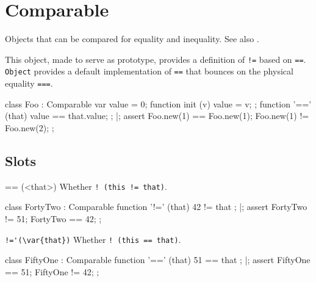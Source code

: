 
\section{Comparable}
Objects that can be compared for equality and inequality.  See also
.

This object, made to serve as prototype, provides a definition of
\lstinline{!=} based on \lstinline{==}.  \lstinline{Object} provides
a default implementation of \lstinline{==} that bounces on the physical
equality \lstinline{===}.

\begin{urbiscript}[firstnumber=1]
class Foo : Comparable
{
  var value = 0;
  function init (v)    { value = v; };
  function '==' (that) { value == that.value; };
}|;
assert
{
  Foo.new(1) == Foo.new(1);
  Foo.new(1) != Foo.new(2);
};
\end{urbiscript}

\subsection{Slots}

\begin{urbiscriptapi}
\item[==](<that>)
  Whether \lstinline|! (this != that)|.
\begin{urbiscript}
class FortyTwo : Comparable
{
  function '!=' (that) { 42 != that };
}|;
assert
{
  FortyTwo != 51;
  FortyTwo == 42;
};
\end{urbiscript}


\item \lstinline+!='(\var{that})+%
  Whether \lstinline|! (this == that)|.

\begin{urbiscript}
class FiftyOne : Comparable
{
  function '==' (that) { 51 == that };
}|;
assert
{
  FiftyOne == 51;
  FiftyOne != 42;
};
\end{urbiscript}
\end{urbiscriptapi}

